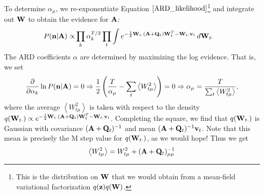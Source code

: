 \documentclass[nofootinbib,amssymb,amsmath]{revtex4}
\newcommand{\ave}[1]{\left\langle #1 \right\rangle}
\newcommand{\vv}{{\bf v}}
\newcommand{\vz}{{\bf z}}
\newcommand{\vn}{{\bf n}}
\newcommand{\vQ}{{\bf Q}}
\newcommand{\vW}{{\bf W}}
\newcommand{\vA}{{\bf A}}
\begin{document}
To determine $\alpha_\mu$, we re-exponentiate Equation $\ref{ARD_likelihood}$\footnote{This is the distribution on $\vW$ that we would obtain from a mean-field variational factorization $q(\vz) q(\vW)$.} and integrate out $\vW$ to obtain the evidence for $\vA$:
%
\begin{align}
P(\vn | \vA) \propto& \prod_k \alpha_k^{T/2} \prod_t \int e^{-\frac{1}{2} \vW_{t \cdot} (\vA + \vQ_t) \vW_{t \cdot}^T - \vW_{t \cdot} \vv_t} \, d \vW_{t \cdot}
\label{ARD_evidence}
\end{align}
%
The ARD coefficients $\alpha$ are determined by maximizing the log evidence.  That is, we set
\begin{align}
\frac{\partial}{\partial \alpha_k} \ln P(\vn | \vA) = 0 \Rightarrow  \frac{1}{2} \left( \frac{T}{\alpha_\mu}  - \sum_t \ave{W_{t\mu}^2} \right) = 0 \Rightarrow \alpha_\mu = \frac{T}{\sum_t \ave{W_{t\mu}^2}},
\end{align}
where the average $\ave{W_{t\mu}^2}$ is taken with respect to the density $q(\vW_{t \cdot}) \propto e^{-\frac{1}{2} \vW_{t \cdot} (\vA + \vQ_t) \vW_{t \cdot}^T - \vW_{t \cdot} \vv_t}$.  Completing the square, we find that $q(\vW_{t \cdot})$ is Gaussian with covariance $(\vA + \vQ_t)^{-1}$ and mean $(\vA + \vQ_t)^{-1} \vv_t$.  Note that this mean is precisely the M step value for $q(\vW_{t \cdot})$, as we would hope!  Thus we get
%
\begin{equation}
\ave{W_{t\mu}^2} = W_{t\mu}^2 + (\vA + \vQ_t)^{-1}_{\mu\mu}
\end{equation}
%
\end{document}

